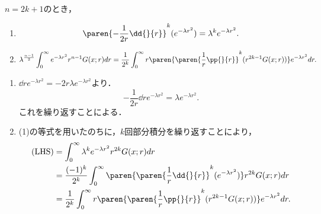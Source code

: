 \documentclass[uplatex,dvipdfmx]{jsreport}
\begin{document}
\begin{lemma}
    $n=2k+1$のとき，
    \begin{enumerate}
        \item \[\paren{-\frac{1}{2r}\dd{}{r}}^k(e^{-\lambda r^2})=\lambda^ke^{-\lambda r^2}.\]
        \item \[\lambda^{\frac{n-1}{2}}\int^\infty_0e^{-\lambda r^2}r^{n-1}G(x;r)dr=\frac{1}{2^k}\int^\infty_0r\paren{\paren{\frac{1}{r}\pp{}{r}}^k(r^{2k-1}G(x;r))}e^{-\lambda r^2}dr.\]
    \end{enumerate}
\end{lemma}
\begin{Proof}\mbox{}
    \begin{enumerate}
        \item $\dd{}{r}e^{-\lambda r^2}=-2r\lambda e^{-\lambda r^2}$より．
        \[-\frac{1}{2r}\dd{}{r}e^{-\lambda r^2}=\lambda e^{-\lambda r^2}.\]
        これを繰り返すことによる．
        \item (1)の等式を用いたのちに，$k$回部分積分を繰り返すことにより，
        \begin{align*}
            \text{(LHS)}&=\int^\infty_0\lambda^ke^{-\lambda r^2}r^{2k}G(x;r)dr\\
            &=\frac{(-1)^k}{2^k}\int^\infty_0\paren{\paren{\frac{1}{r}\dd{}{r}}^k(e^{-\lambda r^2})}r^{2k}G(x;r)dr\\
            &=\frac{1}{2^k}\int^\infty_0r\paren{\paren{\frac{1}{r}\pp{}{r}}^k(r^{2k-1}G(x;r))}e^{-\lambda r^2}dr.
        \end{align*}
    \end{enumerate}
\end{Proof}
\end{document}
